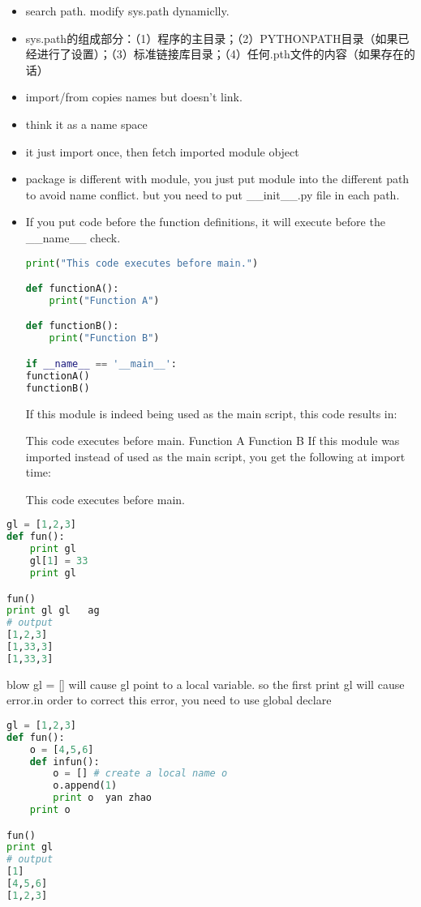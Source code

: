 \documentclass[a4paper,12pt,twoside]{book}
\begin{document}
\begin{itemize}
	\item search path. modify sys.path dynamiclly. 
	\item sys.path的组成部分：（1）程序的主目录；（2）PYTHONPATH目录（如果已经进行了设置）；（3）标准链接库目录；（4）任何.pth文件的内容（如果存在的话） 
	\item import/from copies names but doesn't link.
	\item think it as a name space
	\item it just import once, then fetch imported module object
	\item package is different with module, you just put module into the different path to avoid name conflict. but you need to put \_\_init\_\_.py file in each path. 
	\item If you put code before the function definitions, it will execute before the \_\_name\_\_ check.
\begin{lstlisting}[frame=single, language=python]
print("This code executes before main.") 

def functionA():
	print("Function A")

def functionB():
	print("Function B")

if __name__ == '__main__':
functionA()
functionB()
	\end{lstlisting} 
If this module is indeed being used as the main script, this code results in:

This code executes before main. 
Function A 
Function B
If this module was imported instead of used as the main script, you get the following at import time:

This code executes before main. 

\end{itemize}

\begin{lstlisting}[frame=single, language=python]
gl = [1,2,3]
def fun():
	print gl
	gl[1] = 33
	print gl

fun()
print gl gl   ag 
# output 
[1,2,3]
[1,33,3]
[1,33,3]
\end{lstlisting}  

blow gl = [] will cause gl point to a local variable. so the first print gl will cause error.in order to correct this error, you need to use global declare

\begin{lstlisting}[frame=single, language=python]
gl = [1,2,3]
def fun():
	o = [4,5,6]
	def infun():
		o = [] # create a local name o
		o.append(1)
		print o  yan zhao
	print o

fun()
print gl
# output 
[1]
[4,5,6]
[1,2,3]
\end{lstlisting}  
\end{document}
